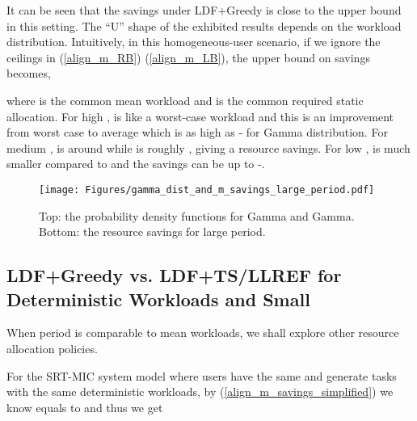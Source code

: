 \documentclass[prodmode,acmtompecs]{acmsmall}
\newcommand{\myComments}[1]{}
\newif\ifdissertation
\newcommand{\dissertationStart}{\ifdissertation  \myComments{Dissertation version: }}
\newcommand{\commentEnd}{\myComments{End}}
\begin{document}
It can be seen that the savings under LDF+Greedy is close to the upper bound in this setting. 
The ``U'' shape of the exhibited results depends on the workload distribution. 
Intuitively, in this homogeneous-user scenario, if we ignore the ceilings in (\ref{align_m_RB}) (\ref{align_m_LB}), the upper bound on savings becomes,

where  is the common mean workload and  is the common required static allocation. 
For high ,  is like a worst-case workload and this is an improvement from worst case to average which is as high as - for Gamma distribution. 
For medium ,  is around  while  is roughly , giving a  resource savings. For low ,  is much smaller compared to  and the savings can be up to -. 
\dissertationStart
Intuitively, in this setting the percentage of resource savings (\ref{align_m_savings}) simplifies to

where  is the common mean task workload and  represents the common required static allocation for each user. 

For SRT applications that require high , under reservation-based static sharing policies we need to allocate each user  which is like worst-case workload while an optimal resource allocation policy only requires  which is even less than  for each user. This is an improvement from worst case to average and is as big as - for Gamma distribution. 
For some applications whose QoS requirements are similar to , e.g., the channel measurement tasks in the CRAN context,  is roughly  while an optimal resource allocation policy only need around , giving a  resource savings. 
For low , the savings can be up to -. 
\commentEnd\fi



\begin{figure}[htp]
  \centering
  \texttt{[image: Figures/gamma\_dist\_and\_m\_savings\_large\_period.pdf]}
\caption{Top: the probability density functions for Gamma and Gamma. Bottom: the resource savings for large period.}
  \label{fig_gamma_dist_and_m_savings_large_period}
\end{figure}


\subsection{LDF+Greedy vs. LDF+TS/LLREF for Deterministic Workloads and Small } 
\dissertationStart
When period  is comparable to mean workloads, we shall explore other resource allocation policies. 

For the SRT-MIC system model where users have the same  and generate tasks with the same deterministic workloads, by (\ref{align_m_savings_simplified}) we know  equals to  and thus we get
\end{document}
